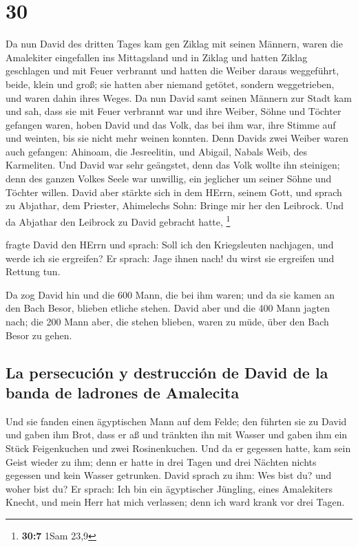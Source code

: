 \hypertarget{section-29}{%
\section{30}\label{section-29}}

 Da nun David des dritten Tages kam gen Ziklag mit seinen
Männern, waren die Amalekiter eingefallen ins Mittagsland und in Ziklag
und hatten Ziklag geschlagen und mit Feuer verbrannt  und
hatten die Weiber daraus weggeführt, beide, klein und groß; sie hatten
aber niemand getötet, sondern weggetrieben, und waren dahin ihres Weges.
 Da nun David samt seinen Männern zur Stadt kam und sah,
dass sie mit Feuer verbrannt war und ihre Weiber, Söhne und Töchter
gefangen waren,  hoben David und das Volk, das bei ihm
war, ihre Stimme auf und weinten, bis sie nicht mehr weinen konnten.
 Denn Davids zwei Weiber waren auch gefangen: Ahinoam, die
Jesreelitin, und Abigail, Nabals Weib, des Karmeliten. 
Und David war sehr geängstet, denn das Volk wollte ihn steinigen; denn
des ganzen Volkes Seele war unwillig, ein jeglicher um seiner Söhne und
Töchter willen. David aber stärkte sich in dem HErrn, seinem Gott,
 und sprach zu Abjathar, dem Priester, Ahimelechs Sohn:
Bringe mir her den Leibrock. Und da Abjathar den Leibrock zu David
gebracht hatte, \footnote{\textbf{30:7} 1Sam 23,9}

 fragte David den HErrn und sprach: Soll ich den
Kriegsleuten nachjagen, und werde ich sie ergreifen? Er sprach: Jage
ihnen nach! du wirst sie ergreifen und Rettung tun.

 Da zog David hin und die 600 Mann, die bei ihm waren; und
da sie kamen an den Bach Besor, blieben etliche stehen. 
David aber und die 400 Mann jagten nach; die 200 Mann aber, die stehen
blieben, waren zu müde, über den Bach Besor zu gehen.

\hypertarget{la-persecuciuxf3n-y-destrucciuxf3n-de-david-de-la-banda-de-ladrones-de-amalecita}{%
\subsection{La persecución y destrucción de David de la banda de
ladrones de
Amalecita}\label{la-persecuciuxf3n-y-destrucciuxf3n-de-david-de-la-banda-de-ladrones-de-amalecita}}

 Und sie fanden einen ägyptischen Mann auf dem Felde; den
führten sie zu David und gaben ihm Brot, dass er aß und tränkten ihn mit
Wasser  und gaben ihm ein Stück Feigenkuchen und zwei
Rosinenkuchen. Und da er gegessen hatte, kam sein Geist wieder zu ihm;
denn er hatte in drei Tagen und drei Nächten nichts gegessen und kein
Wasser getrunken.  David sprach zu ihm: Wes bist du? und
woher bist du? Er sprach: Ich bin ein ägyptischer Jüngling, eines
Amalekiters Knecht, und mein Herr hat mich verlassen; denn ich ward
krank vor drei Tagen.

